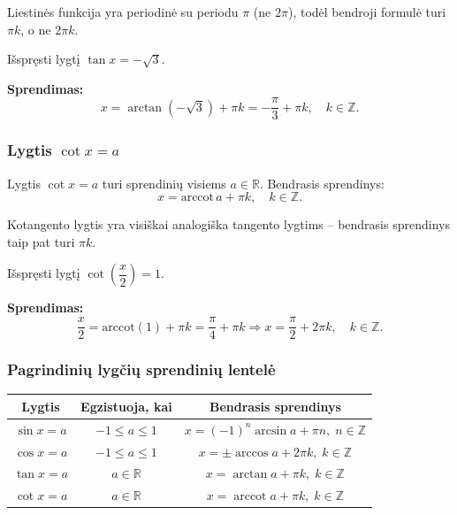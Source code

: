 \begin{remark}
Liestinės funkcija yra periodinė su periodu \(\pi\) (ne \(2\pi\)), todėl bendroji formulė turi \(\pi k\), o ne \(2\pi k\).
\end{remark}

\begin{example}
Išspręsti lygtį \(\tan x = -\sqrt{3}\).

\textbf{Sprendimas:}
\[
x = \arctan(-\sqrt{3}) + \pi k = -\frac{\pi}{3} + \pi k,\quad k \in \mathbb{Z}.
\]
\end{example}

\subsubsection{Lygtis \(\cot x = a\)}

\begin{definition}
Lygtis \(\cot x = a\) turi sprendinių visiems \(a \in \mathbb{R}\). Bendrasis sprendinys:
\[
x = \text{arccot}\, a + \pi k, \quad k \in \mathbb{Z}.
\]
\end{definition}

\begin{remark}
Kotangento lygtis yra visiškai analogiška tangento lygtims – bendrasis sprendinys taip pat turi \(\pi k\).
\end{remark}

\begin{example}
Išspręsti lygtį \(\cot\!\left(\dfrac{x}{2}\right) = 1\).

\textbf{Sprendimas:}
\[
\frac{x}{2} = \text{arccot}(1) + \pi k = \frac{\pi}{4} + \pi k \Rightarrow x = \frac{\pi}{2} + 2\pi k,\quad k \in \mathbb{Z}.
\]
\end{example}

\subsubsection{Pagrindinių lygčių sprendinių lentelė}

\begin{center}
\renewcommand{\arraystretch}{1.6}
\begin{tabular}{|c|c|c|}
\hline
\textbf{Lygtis} & \textbf{Egzistuoja, kai} & \textbf{Bendrasis sprendinys} \\
\hline
\(\sin x = a\) & \(-1 \leq a \leq 1\) & \(x = (-1)^n \arcsin a + \pi n,\; n \in \mathbb{Z}\) \\
\hline
\(\cos x = a\) & \(-1 \leq a \leq 1\) & \(x = \pm\arccos a + 2\pi k,\; k \in \mathbb{Z}\) \\
\hline
\(\tan x = a\) & \(a \in \mathbb{R}\) & \(x = \arctan a + \pi k,\; k \in \mathbb{Z}\) \\
\hline
\(\cot x = a\) & \(a \in \mathbb{R}\) & \(x = \operatorname{arccot} a + \pi k,\; k \in \mathbb{Z}\) \\
\hline
\end{tabular}
\end{center}

